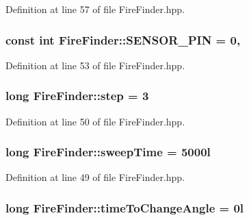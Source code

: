 Definition at line 57 of file Fire\-Finder.\-hpp.

\hypertarget{classFireFinder_a5afc5290c8ba58893228414ba5965ed3}{
\subsubsection[{S\-E\-N\-S\-O\-R\-\_\-\-P\-I\-N}]{\setlength{\rightskip}{0pt plus 5cm}const int Fire\-Finder\-::\-S\-E\-N\-S\-O\-R\-\_\-\-P\-I\-N = 0\hspace{0.3cm}{\ttfamily [static]}, {\ttfamily [private]}}}\label{classFireFinder_a5afc5290c8ba58893228414ba5965ed3}


Definition at line 53 of file Fire\-Finder.\-hpp.

\hypertarget{classFireFinder_ad482526cf32997919cbc31f61d12065d}{
\subsubsection[{step}]{\setlength{\rightskip}{0pt plus 5cm}long Fire\-Finder\-::step = 3\hspace{0.3cm}{\ttfamily [private]}}}\label{classFireFinder_ad482526cf32997919cbc31f61d12065d}


Definition at line 50 of file Fire\-Finder.\-hpp.

\hypertarget{classFireFinder_aaa38192d82bc4120129b72fee61f72f1}{
\subsubsection[{sweep\-Time}]{\setlength{\rightskip}{0pt plus 5cm}long Fire\-Finder\-::sweep\-Time = 5000l\hspace{0.3cm}{\ttfamily [private]}}}\label{classFireFinder_aaa38192d82bc4120129b72fee61f72f1}


Definition at line 49 of file Fire\-Finder.\-hpp.

\hypertarget{classFireFinder_a97b1a598ddb7886feb4a96a4931cc103}{
\subsubsection[{time\-To\-Change\-Angle}]{\setlength{\rightskip}{0pt plus 5cm}long Fire\-Finder\-::time\-To\-Change\-Angle = 0l\hspace{0.3cm}{\ttfamily [private]}}}\label{classFireFinder_a97b1a598ddb7886feb4a96a4931cc103}


